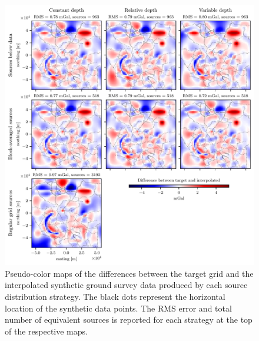 \begin{figure}
    \includegraphics[width=\linewidth]{figs/ground_survey_differences.pdf}
    \caption{
        Pseudo-color maps of the differences between the target grid and the
        interpolated synthetic ground survey data produced by each source
        distribution strategy.
        The black dots represent the horizontal location of the synthetic data
        points. The RMS error and total number of equivalent sources is
        reported for each strategy at the top of the respective maps.
    }
    \label{fig:ground-survey-differences}
\end{figure}

